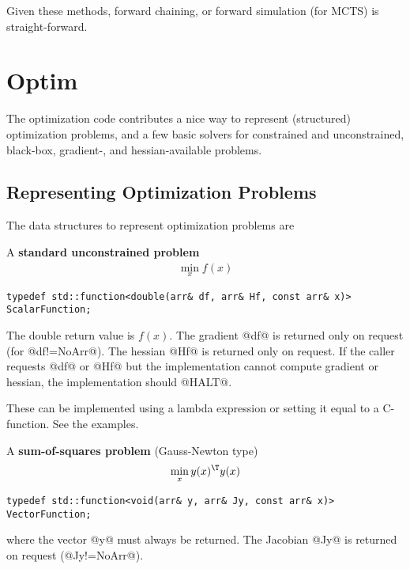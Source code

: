 \documentclass[10pt,fleqn,twoside]{article}
\begin{document}
{{Given these methods, forward chaining, or forward simulation (for
MCTS) is straight-forward. 


\section{Optim}

The optimization code contributes a nice way to represent (structured)
optimization problems, and a few basic solvers for constrained and
unconstrained, black-box, gradient-, and hessian-available problems.

\subsection{Representing Optimization Problems}

The data structures to represent optimization problems are

A \textbf{standard unconstrained problem}
\begin{align}
\min_x f(x)
\end{align}
\begin{shaded}
\begin{Verbatim}
typedef std::function<double(arr& df, arr& Hf, const arr& x)> ScalarFunction;
\end{Verbatim}
\end{shaded}
The double return value is $f(x)$. The gradient @df@ is returned only
on request (for @df!=NoArr@). The hessian @Hf@ is returned only on
request. If the caller requests @df@ or @Hf@ but the implementation
cannot compute gradient or hessian, the implementation should @HALT@.

These can be implemented using a lambda expression or setting it equal
to a C-function. See the examples. 

A \textbf{sum-of-squares problem} (Gauss-Newton type)
\begin{align}
\min_x y(x)^\T y(x)
\end{align}
\begin{shaded}
\begin{Verbatim}
typedef std::function<void(arr& y, arr& Jy, const arr& x)> VectorFunction;
\end{Verbatim}
\end{shaded}
where the vector @y@ must always be returned. The Jacobian @Jy@ is
returned on request (@Jy!=NoArr@).

}}
\end{document}
